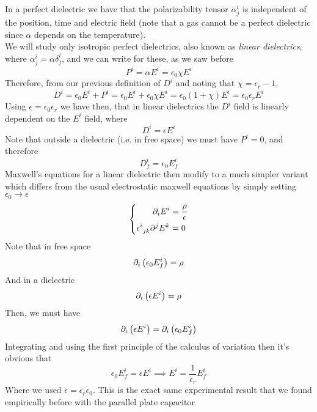 \documentclass[../electromagnetism]{subfiles}
\begin{document}
In a perfect dielectric we have that the polarizability tensor $\alpha^i_j$ is independent of the position, time and electric field (note that a gas cannot be a perfect dielectric since $\alpha$ depends on the temperature).\\
We will study only isotropic perfect dielectrics, also known as \textit{linear dielectrics}, where $\alpha^i_j=\alpha\delta^i_j$, and we can write for these, as we saw before
\begin{equation}
	P^i=\alpha E^i=\epsilon_0\chi E^i
	\label{eq:lineardiepol}
\end{equation}
Therefore, from our previous definition of $D^i$ and noting that $\chi=\epsilon_r-1$,
\begin{equation}
	D^i=\epsilon_0E^i+P^i=\epsilon_0E^i+\epsilon_0\chi E^i=\epsilon_0\left( 1+\chi \right)E^i=\epsilon_0\epsilon_rE^i
	\label{eq:displacementfieldlindie}
\end{equation}
Using $\epsilon=\epsilon_0\epsilon_r$ we have then, that in linear dielectrics the $D^i$ field is linearly dependent on the $E^i$ field, where
\begin{equation}
	D^i=\epsilon E^i
	\label{eq:lindieDErel}
\end{equation}
Note that outside a dielectric (i.e. in free space) we must have $P^i=0$, and therefore
\begin{equation}
	D^i_{f}=\epsilon_0E^i_{f}
	\label{eq:freespaceDE}
\end{equation}
Maxwell's equations for a linear dielectric then modify to a much simpler variant which differs from the usual electrostatic maxwell equations by simply setting $\epsilon_0\to\epsilon$
\begin{equation}
	\left\{ \begin{aligned}
			\partial_iE^i&=\frac{\rho}{\epsilon}\\
			\epsilon^{i}_{\ jk}\partial^jE^k&=0
	\end{aligned}\right.
	\label{eq:linperfdiemweq}
\end{equation}
Note that in free space
\begin{equation*}
	\partial_i\left( \epsilon_0E^i_f \right)=\rho
\end{equation*}
And in a dielectric
\begin{equation*}
	\partial_i\left( \epsilon E^i \right)=\rho
\end{equation*}
Then, we must have
\begin{equation*}
	\partial_i\left( \epsilon E^i \right)=\partial_i\left( \epsilon_0E^i_f \right)
\end{equation*}
Integrating and using the first principle of the calculus of variation then it's obvious that
\begin{equation}
	\epsilon_0E^i_f=\epsilon E^i\implies E^i=\frac{1}{\epsilon_r}E_f^i
	\label{eq:empiricalreconnectiondie}
\end{equation}
Where we used $\epsilon=\epsilon_r\epsilon_0$. This is the exact same experimental result that we found empirically before with the parallel plate capacitor
\end{document}
